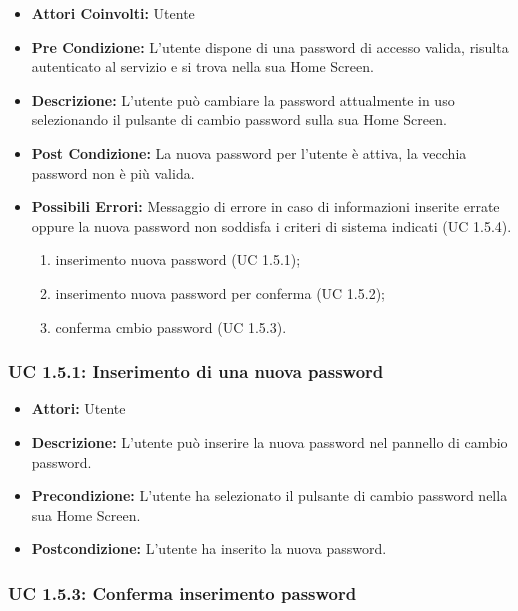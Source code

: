 \begin{itemize}
    \item \textbf{Attori Coinvolti:} Utente
    \item \textbf{Pre Condizione:} L'utente dispone di una password di accesso valida, risulta autenticato al servizio e si trova nella sua Home Screen.
    \item \textbf{Descrizione:} L'utente può cambiare la password attualmente in uso selezionando il pulsante di cambio password sulla sua Home Screen.
    \item \textbf{Post Condizione:} La nuova password per l'utente è attiva, la vecchia password non è più valida.
    \item \textbf{Possibili Errori:} Messaggio di errore in caso di informazioni inserite errate oppure la nuova password non soddisfa i criteri di sistema indicati (UC 1.5.4).

    \begin{enumerate}
        \item inserimento nuova password (UC 1.5.1);
        \item inserimento nuova password per conferma (UC 1.5.2);
        \item conferma cmbio password (UC 1.5.3).
    \end{enumerate}

\end{itemize}

\subsubsection{UC 1.5.1: Inserimento di una nuova password}

\begin{itemize}
    \item \textbf{Attori:} Utente
    \item \textbf{Descrizione:} L'utente può inserire la nuova password nel pannello di cambio password.
    \item \textbf{Precondizione:} L'utente ha selezionato il pulsante di cambio password nella sua Home Screen.
    \item \textbf{Postcondizione:} L'utente ha inserito la nuova password.
\end{itemize}

\subsubsection{UC 1.5.3: Conferma inserimento password }

